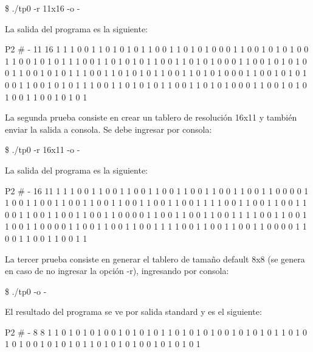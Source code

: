 \documentclass{article}
\begin{document}
{\ttfamily\footnotesize
\indent \$ ./tp0 -r 11x16 -o -\\}
\smallskip

	La salida del programa es la siguiente:

\begin{center}
P2
# -
11 16
1
1 1 0 0 1 1 0 1 0 1 0 
1 1 0 0 1 1 0 1 0 1 0 
0 0 1 1 0 0 1 0 1 0 1 
0 0 1 1 0 0 1 0 1 0 1 
1 1 0 0 1 1 0 1 0 1 0 
1 1 0 0 1 1 0 1 0 1 0 
0 0 1 1 0 0 1 0 1 0 1 
0 0 1 1 0 0 1 0 1 0 1 
1 1 0 0 1 1 0 1 0 1 0 
1 1 0 0 1 1 0 1 0 1 0 
0 0 1 1 0 0 1 0 1 0 1 
0 0 1 1 0 0 1 0 1 0 1 
1 1 0 0 1 1 0 1 0 1 0 
1 1 0 0 1 1 0 1 0 1 0 
0 0 1 1 0 0 1 0 1 0 1 
0 0 1 1 0 0 1 0 1 0 1 
\end{center}
\bigskip\bigskip

	\par
	La segunda prueba consiste en crear un tablero de resolución 16x11 y también enviar la salida a consola. Se debe ingresar por consola:
	\smallskip

{\ttfamily\footnotesize
\indent \$ ./tp0 -r 16x11 -o -\\}
\smallskip

	La salida del programa es la siguiente:

\begin{center}
P2
# -
16 11
1
1 1 0 0 1 1 0 0 1 1 0 0 1 1 0 0 
1 1 0 0 1 1 0 0 1 1 0 0 1 1 0 0 
0 0 1 1 0 0 1 1 0 0 1 1 0 0 1 1 
0 0 1 1 0 0 1 1 0 0 1 1 0 0 1 1 
1 1 0 0 1 1 0 0 1 1 0 0 1 1 0 0 
1 1 0 0 1 1 0 0 1 1 0 0 1 1 0 0 
0 0 1 1 0 0 1 1 0 0 1 1 0 0 1 1 
1 1 0 0 1 1 0 0 1 1 0 0 1 1 0 0 
0 0 1 1 0 0 1 1 0 0 1 1 0 0 1 1 
1 1 0 0 1 1 0 0 1 1 0 0 1 1 0 0 
0 0 1 1 0 0 1 1 0 0 1 1 0 0 1 1  
\end{center}
\bigskip\bigskip

	\par
	La tercer prueba consiste en generar el tablero de tamaño default 8x8 (se genera en caso de no ingresar la opción -r), ingresando por consola:
	\smallskip

{\ttfamily\footnotesize
\indent \$ ./tp0 -o -\\}
\smallskip

	El resultado del programa se ve por salida standard y es el siguiente:

\begin{center}
P2
# -
8 8
1
1 0 1 0 1 0 1 0 
0 1 0 1 0 1 0 1 
1 0 1 0 1 0 1 0 
0 1 0 1 0 1 0 1 
1 0 1 0 1 0 1 0 
0 1 0 1 0 1 0 1 
1 0 1 0 1 0 1 0 
0 1 0 1 0 1 0 1 
\end{center}
\bigskip\bigskip
\end{document}
